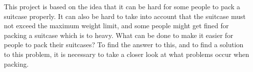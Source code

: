 This project is based on the idea that it can be hard for some people to pack a suitcase properly. It can also be hard to take into account that the suitcase must not exceed the maximum weight limit, and some people might get fined for packing a suitcase which is to heavy. What can be done to make it easier for people to pack their suitcases? To find the answer to this, and to find a solution to this problem, it is necessary to take a closer look at what problems occur when packing.